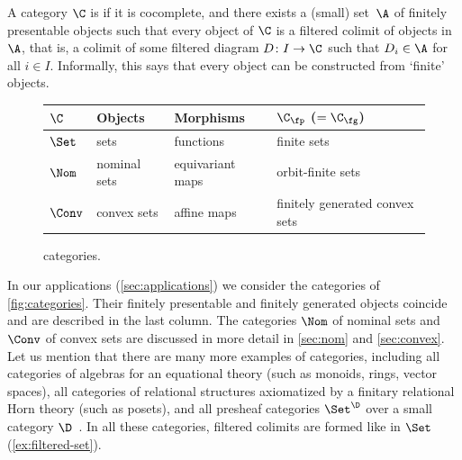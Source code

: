 \documentclass[a4paper,UKenglish, autoref, numberwithinsect, final]{lipics-v2021}
\numberwithin{equation}{section}
\theoremstyle{plain}
\theoremstyle{definition}
\begin{document}
A category $\C$ is \emph{\lfplong} if it is cocomplete, and there exists a (small) set~$\A$ of finitely presentable objects such that every object of $\C$ is a filtered colimit of objects in $\A$, that is, a colimit of some filtered diagram $D\colon I\to \C$ such that $D_i\in \A$ for all $i\in I$. Informally, this says that every object can be constructed from `finite' objects.

\begin{example}\label{ex:categories} 
\begin{figure}[t]
\centering
\def\arraystretch{1.0}
\begin{tabular}{@{}p{1.5cm}p{2.5cm}p{3.2cm}p{5.5cm}@{}}
\toprule
$\C$ & Objects & Morphisms & $\C_\fp$ ($=\C_\fg$) \\
\midrule
$\Set$ & sets & functions & finite sets~ \\
%
$\Nom$ & nominal sets &  equivariant maps & orbit-finite sets \\
$\Conv$ & convex sets & affine maps & finitely generated convex sets \\
\bottomrule
\end{tabular}
\caption{\Lfplong categories.}\label{fig:categories}
%
\end{figure}
In our applications (\autoref{sec:applications}) we consider the \lfp categories of \autoref{fig:categories}. Their finitely presentable and finitely generated objects coincide and are described in the last column. The categories $\Nom$ of nominal sets and $\Conv$ of convex sets are discussed in more detail in \autoref{sec:nom} and \autoref{sec:convex}. Let us mention that there are many more examples of \lfp categories, including all categories of algebras for an equational theory (such as monoids, rings, vector spaces), all categories of relational structures axiomatized by a finitary relational Horn theory (such as posets), and all presheaf categories $\Set^\D$ over a small category $\D$~\cite{adamek_rosicky_1994}. In all these categories, filtered colimits are formed like in $\Set$ (\autoref{ex:filtered-set}).
\end{example}
\end{document}
